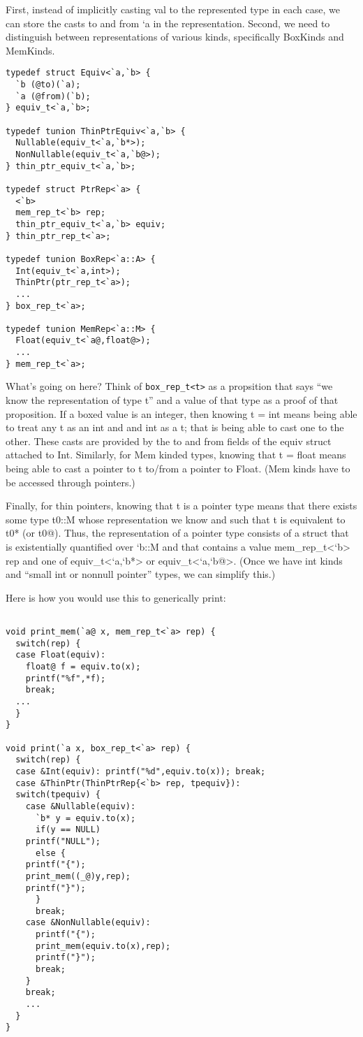 First, instead of implicitly casting val to the represented type in each case, we can store the casts to and from `a in the representation.  Second, we need to distinguish between representations of various kinds, specifically BoxKinds and MemKinds.

\begin{verbatim} 
typedef struct Equiv<`a,`b> {
  `b (@to)(`a);
  `a (@from)(`b);
} equiv_t<`a,`b>;

typedef tunion ThinPtrEquiv<`a,`b> {
  Nullable(equiv_t<`a,`b*>);
  NonNullable(equiv_t<`a,`b@>);
} thin_ptr_equiv_t<`a,`b>;

typedef struct PtrRep<`a> {
  <`b> 
  mem_rep_t<`b> rep;
  thin_ptr_equiv_t<`a,`b> equiv;
} thin_ptr_rep_t<`a>;

typedef tunion BoxRep<`a::A> {
  Int(equiv_t<`a,int>);
  ThinPtr(ptr_rep_t<`a>);
  ...
} box_rep_t<`a>;

typedef tunion MemRep<`a::M> {
  Float(equiv_t<`a@,float@>);
  ...
} mem_rep_t<`a>;
\end{verbatim}

What's going on here?  Think of \texttt{box\_rep\_t<t>} as a propsition that says ``we know the representation of type t'' and a value of that type as a proof of that proposition.  If a boxed value is an integer, then knowing t = int means being able to treat any t as an int and and int as a t; that is being able to cast one to the other.  These casts are provided by the to and from fields of the equiv struct attached to Int.  Similarly, for Mem kinded types, knowing that t = float means being able to cast a pointer to t to/from a pointer to Float.  (Mem kinds have to be accessed through pointers.)

Finally, for thin pointers, knowing that t is a pointer type means that there exists some type t0::M whose representation we know and such that t is equivalent to t0* (or t0@).  Thus, the representation of a pointer type consists of a struct that is existentially quantified over `b::M and that contains a value mem_rep_t<`b> rep and one of equiv_t<`a,`b*> or equiv_t<`a,`b@>.  (Once we have int kinds and ``small int or nonnull pointer'' types, we can simplify this.)

Here is how you would use this to generically print:

\begin{verbatim}

void print_mem(`a@ x, mem_rep_t<`a> rep) {
  switch(rep) {
  case Float(equiv): 
    float@ f = equiv.to(x);
    printf("%f",*f);
    break;
  ...
  }
}

void print(`a x, box_rep_t<`a> rep) {
  switch(rep) {
  case &Int(equiv): printf("%d",equiv.to(x)); break;
  case &ThinPtr(ThinPtrRep{<`b> rep, tpequiv}):
  switch(tpequiv) {
    case &Nullable(equiv): 
      `b* y = equiv.to(x);
      if(y == NULL) 
	printf("NULL");
      else { 
	printf("{");
	print_mem((_@)y,rep);
	printf("}");
      }
      break;
    case &NonNullable(equiv):
      printf("{");
      print_mem(equiv.to(x),rep);
      printf("}");
      break;
    }
    break;
    ...
  }
}
\end{verbatim}

